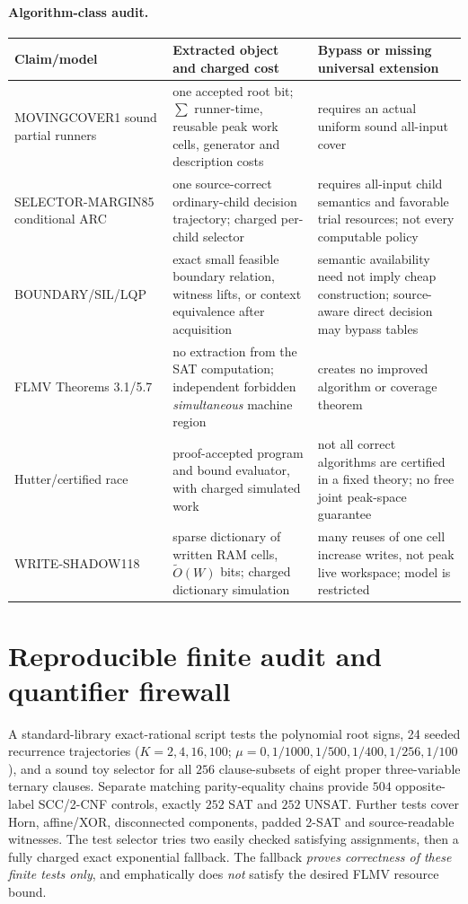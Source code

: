\documentclass[11pt]{article}
\begin{document}
\paragraph{Algorithm-class audit.}
\begin{center}\small
\begin{tabular}{p{.20\linewidth}p{.32\linewidth}p{.34\linewidth}}
\toprule
Claim/model & Extracted object and charged cost & Bypass or missing universal extension\\\midrule
MOVINGCOVER1 sound partial runners & one accepted root bit; $\sum$ runner-time, reusable peak work cells, generator and description costs & requires an actual uniform sound all-input cover\\
SELECTOR-MARGIN85 conditional ARC & one source-correct ordinary-child decision trajectory; charged per-child selector & requires all-input child semantics and favorable trial resources; not every computable policy\\
BOUNDARY/SIL/LQP & exact small feasible boundary relation, witness lifts, or context equivalence after acquisition & semantic availability need not imply cheap construction; source-aware direct decision may bypass tables\\
FLMV Theorems 3.1/5.7 & no extraction from the SAT computation; independent forbidden \emph{simultaneous} machine region & creates no improved algorithm or coverage theorem\\
Hutter/certified race & proof-accepted program and bound evaluator, with charged simulated work & not all correct algorithms are certified in a fixed theory; no free joint peak-space guarantee\\
WRITE-SHADOW118 & sparse dictionary of written RAM cells, $\tilde O(W)$ bits; charged dictionary simulation & many reuses of one cell increase writes, not peak live workspace; model is restricted\\
\bottomrule
\end{tabular}
\end{center}

\section{Reproducible finite audit and quantifier firewall}
A standard-library exact-rational script tests the polynomial root signs, 24 seeded recurrence trajectories ($K=2,4,16,100$; $\mu=0,1/1000,1/500,1/400,1/256,1/100$), and a sound toy selector for all $256$ clause-subsets of eight proper three-variable ternary clauses. Separate matching parity-equality chains provide $504$ opposite-label SCC/2-CNF controls, exactly $252$ SAT and $252$ UNSAT. Further tests cover Horn, affine/XOR, disconnected components, padded 2-SAT and source-readable witnesses. The test selector tries two easily checked satisfying assignments, then a fully charged exact exponential fallback. The fallback \emph{proves correctness of these finite tests only}, and emphatically does \emph{not} satisfy the desired FLMV resource bound.
\end{document}
